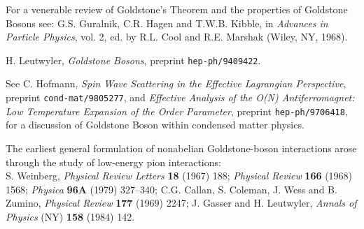\documentclass[12pt]{article}
\begin{document}
\begin{thebibliography}{99}
For a venerable review of Goldstone's Theorem and the properties of
Goldstone Bosons see: G.S. Guralnik, C.R. Hagen and T.W.B. Kibble, 
in {\it Advances in Particle Physics}, vol. 2, ed. by R.L. Cool 
and R.E. Marshak (Wiley, NY, 1968).

H. Leutwyler, {\sl Goldstone Bosons}, preprint {\tt hep-ph/9409422}.

See C. Hofmann, {\sl Spin Wave Scattering in the Effective Lagrangian Perspective}, preprint
{\tt cond-mat/9805277}, and {\sl Effective Analysis of the O(N) Antiferromagnet:
Low Temperature Expansion of the Order Parameter}, preprint {\tt hep-ph/9706418},
for a discussion of Goldstone Boson within condensed matter physics.

The earliest general formulation of nonabelian
Goldstone-boson interactions 
arose through the study of low-energy pion interactions:\\
S. Weinberg, {\it Physical Review Letters} {\bf 18} (1967) 188;
{\it Physical Review}  {\bf 166} (1968) 1568; 
{\it Physica} {\bf 96A} (1979) 327--340; 
C.G. Callan, S. Coleman, J. Wess and B. Zumino, {\it Physical Review}
{\bf 177} (1969) 2247;
J. Gasser and H. Leutwyler, 
{\it Annals of Physics} (NY) {\bf 158} (1984) 142.


\end{thebibliography}
\end{document}
